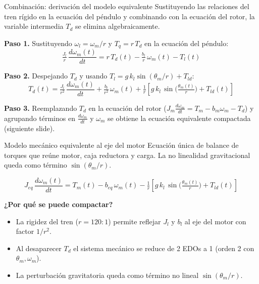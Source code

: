 \documentclass[aspectratio=169,t]{beamer}
\begin{document}
\begin{frame}{Combinación: derivación del modelo equivalente}
{\small\color{uncGray}Sustituyendo las relaciones del tren rígido en la ecuación del péndulo y combinando con la ecuación del rotor, la variable intermedia $T_d$ se elimina algebraicamente.}\par
\vspace{2mm}

\textbf{Paso 1.} Sustituyendo $\omega_l = \omega_m/r$ y $T_q = r\,T_d$ en la ecuación del péndulo:
\begin{equation*}
\tfrac{J_l}{r}\,\frac{d\omega_m(t)}{dt} = r\,T_d(t) - \tfrac{b_l}{r}\,\omega_m(t) - T_l(t)
\end{equation*}

\textbf{Paso 2.} Despejando $T_d$ y usando $T_l = g\,k_l\sin(\theta_m/r)+T_{ld}$:
\begin{equation*}
T_d(t) = \tfrac{J_l}{r^2}\,\frac{d\omega_m(t)}{dt} + \tfrac{b_l}{r^2}\,\omega_m(t) + \tfrac{1}{r}\!\left[g\,k_l\,\sin\!\big(\tfrac{\theta_m(t)}{r}\big) + T_{ld}(t)\right]
\end{equation*}

\textbf{Paso 3.} Reemplazando $T_d$ en la ecuación del rotor ($J_m\frac{d\omega_m}{dt}=T_m-b_m\omega_m-T_d$) y agrupando términos en $\frac{d\omega_m}{dt}$ y $\omega_m$ se obtiene la ecuación equivalente compactada (siguiente slide).
\end{frame}

\begin{frame}{Modelo mecánico equivalente al eje del motor}
{\small\color{uncGray}Ecuación única de balance de torques que reúne motor, caja reductora y carga. La no linealidad gravitacional queda como término $\sin(\theta_m/r)$.}\par
\vspace{8mm}

\begin{equation*}
\boxed{\;\;
J_{eq}\,\frac{d\omega_m(t)}{dt} = T_m(t) - b_{eq}\,\omega_m(t) - \tfrac{1}{r}\!\left[g\,k_l\,\sin\!\big(\tfrac{\theta_m(t)}{r}\big) + T_{ld}(t)\right]
\;\;}
\end{equation*}

\vspace{8mm}
\textbf{¿Por qué se puede compactar?}
\begin{itemize}
\item La rigidez del tren ($r=120{:}1$) permite reflejar $J_l$ y $b_l$ al eje del motor con factor $1/r^2$.
\item Al desaparecer $T_d$ el sistema mecánico se reduce de 2 EDOs a 1 (orden 2 con $\theta_m,\omega_m$).
\item La perturbación gravitatoria queda como término no lineal $\sin(\theta_m/r)$.
\end{itemize}
\end{frame}
\end{document}
